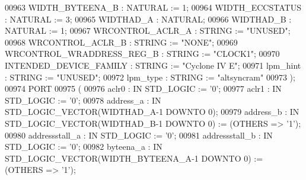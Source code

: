 \begin{DoxyCode}
{00963         WIDTH\_BYTEENA\_B :   \textcolor{comment}{NATURAL} := \textcolor{vhdllogic}{}\textcolor{vhdllogic}{1};
00964         WIDTH\_ECCSTATUS :   \textcolor{comment}{NATURAL} := \textcolor{vhdllogic}{}\textcolor{vhdllogic}{3};
00965         WIDTHAD\_A   :   \textcolor{comment}{NATURAL};
00966         WIDTHAD\_B   :   \textcolor{comment}{NATURAL} := \textcolor{vhdllogic}{}\textcolor{vhdllogic}{1};
00967         WRCONTROL\_ACLR\_A    :   \textcolor{comment}{STRING} := \textcolor{keyword}{"UNUSED"};
00968         WRCONTROL\_ACLR\_B    :   \textcolor{comment}{STRING} := \textcolor{keyword}{"NONE"};
00969         WRCONTROL\_WRADDRESS\_REG\_B   :   \textcolor{comment}{STRING} := \textcolor{keyword}{"CLOCK1"};
00970         INTENDED\_DEVICE\_FAMILY  :   \textcolor{comment}{STRING} := \textcolor{keyword}{"Cyclone IV E"};
00971         lpm\_hint    :   \textcolor{comment}{STRING} := \textcolor{keyword}{"UNUSED"};
00972         lpm\_type    :   \textcolor{comment}{STRING} := \textcolor{keyword}{"altsyncram"}
00973      );
00974      \textcolor{keywordflow}{PORT}
00975      ( 
00976         aclr0   :   \textcolor{keywordflow}{IN} \textcolor{comment}{STD\_LOGIC} := '\textcolor{vhdllogic}{}\textcolor{vhdllogic}{0}';
00977         aclr1   :   \textcolor{keywordflow}{IN} \textcolor{comment}{STD\_LOGIC} := '\textcolor{vhdllogic}{}\textcolor{vhdllogic}{0}';
00978         address\_a   :   \textcolor{keywordflow}{IN} \textcolor{comment}{STD\_LOGIC\_VECTOR}(WIDTHAD\_A\textcolor{vhdlchar}{-}\textcolor{vhdllogic}{}\textcolor{vhdllogic}{1} \textcolor{keywordflow}{DOWNTO} \textcolor{vhdllogic}{}\textcolor{vhdllogic}{0});
00979         address\_b   :   \textcolor{keywordflow}{IN} \textcolor{comment}{STD\_LOGIC\_VECTOR}(WIDTHAD\_B\textcolor{vhdlchar}{-}\textcolor{vhdllogic}{}\textcolor{vhdllogic}{1} \textcolor{keywordflow}{DOWNTO} \textcolor{vhdllogic}{}\textcolor{vhdllogic}{0}) := (\textcolor{keywordflow}{OTHERS} => '\textcolor{vhdllogic}{}\textcolor{vhdllogic}{1}');
00980         addressstall\_a  :   \textcolor{keywordflow}{IN} \textcolor{comment}{STD\_LOGIC} := '\textcolor{vhdllogic}{}\textcolor{vhdllogic}{0}';
00981         addressstall\_b  :   \textcolor{keywordflow}{IN} \textcolor{comment}{STD\_LOGIC} := '\textcolor{vhdllogic}{}\textcolor{vhdllogic}{0}';
00982         byteena\_a   :   \textcolor{keywordflow}{IN} \textcolor{comment}{STD\_LOGIC\_VECTOR}(WIDTH\_BYTEENA\_A\textcolor{vhdlchar}{-}\textcolor{vhdllogic}{}\textcolor{vhdllogic}{1} \textcolor{keywordflow}{DOWNTO} \textcolor{vhdllogic}{}\textcolor{vhdllogic}{0}) := (\textcolor{keywordflow}{OTHERS} => '\textcolor{vhdllogic}{}\textcolor{vhdllogic}{1}');
}
\end{DoxyCode}
